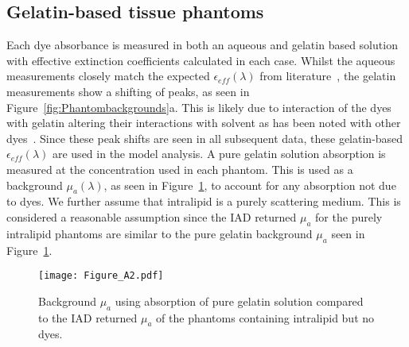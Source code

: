 
\subsection{Gelatin-based tissue phantoms}\label{sec:resultsPhantoms}
Each dye absorbance is measured in both an aqueous and gelatin based solution with effective extinction coefficients calculated in each case. Whilst the aqueous measurements closely match the expected $\epsilon_{eff}(\lambda)$ from literature~\citep{Taniguchi2018}, the gelatin measurements show a shifting of peaks, as seen in Figure~\ref{fig:Phantombackgrounds}a. This is likely due to interaction of the dyes with gelatin altering their interactions with solvent as has been noted with other dyes~\citep{Cook2011}.
Since these peak shifts are seen in all subsequent data, these gelatin-based $\epsilon_{eff}(\lambda)$ are used in the model analysis. A pure gelatin solution absorption is measured at the concentration used in each phantom. This is used as a background $\mu_a(\lambda)$, as seen in Figure~\ref{fig:muaback}, to account for any absorption not due to dyes.
We further assume that intralipid is a purely scattering medium. This is considered a reasonable assumption since the IAD returned $\mu_a$ for the purely intralipid phantoms are similar to the pure gelatin background $\mu_a$ seen in Figure~\ref{fig:muaback}.

\begin{figure}[htb!]
    \centering
    \texttt{[image: Figure\_A2.pdf]}
    \caption{Background $\mu_a$ using absorption of pure gelatin solution compared to the IAD returned $\mu_a$ of the phantoms containing intralipid but no dyes.}
 \label{fig:muaback}
\end{figure}

